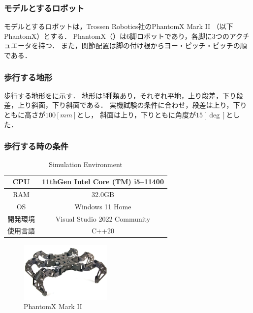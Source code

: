 \subsubsection{モデルとするロボット}
モデルとするロボットは，Trossen Robotics社のPhantomX Mark I\hspace{-1.2pt}I \cite{cita:phantom_x_mark_2}  %
（以下PhantomX）とする．
PhantomX（）は6脚ロボットであり，各脚に3つのアクチュエータを持つ．
また，関節配置は脚の付け根からヨー・ピッチ・ピッチの順である．

\subsubsection{歩行する地形}
歩行する地形をに示す．
地形は5種類あり，それぞれ平地，上り段差，下り段差，上り斜面，下り斜面である．
実機試験の条件に合わせ，段差は上り，下りともに高さが$100 [mm]$とし，
斜面は上り，下りともに角度が$15 [\deg]$とした．

\subsubsection{歩行する時の条件}

\begin{table}[htbp]
	\caption{Simulation Environment}
	\label{tab:simulation_env}  %
	\begin{center}
   	\begin{tabular}{|c||c|} \hline  %
      CPU & 11thGen Intel Core (TM) i5--11400  \\ \hline  %
      RAM & 32.0GB  \\ \hline  %
      OS & Windows 11 Home  \\ \hline  %
      開発環境 & Visual Studio 2022 Community  \\ \hline  %
      使用言語 & C++20  \\ \hline  %
    \end{tabular}
  \end{center}
\end{table}

\begin{figure}[htbp]
  \begin{center}
    \includegraphics[width=45mm, clip]{figure/chapter2/phantomx_mk2.jpg}
    \caption{PhantomX Mark I\hspace{-1.2pt}I}
    \label{fig:phantomx_mk2} %
  \end{center}
\end{figure}

